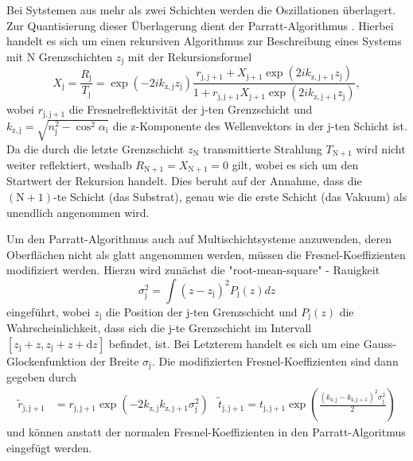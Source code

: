 Bei Sytstemen aus mehr als zwei Schichten werden die Oszillationen überlagert. Zur Quantisierung dieser Überlagerung dient der Parratt-Algorithmus \cite{parratt}. Hierbei handelt es sich um einen rekursiven Algorithmus zur Beschreibung eines Systems mit N Grenzschichten $z_\mathrm{j}$ mit der Rekursionsformel
\begin{equation*}
  X_\mathrm{j} = \frac{R_\mathrm{j}}{T_\mathrm{j}} = \exp \left( -2 i k_\mathrm{z,j} z_\mathrm{j} \right) \frac{ r_{\mathrm{j,j}+1} + X_{\mathrm{j}+1} \exp \left( 2i k_{\mathrm{z,j}+1} z_\mathrm{j} \right) }{ 1 + r_{\mathrm{j,j}+1} X_{\mathrm{j}+1} \exp \left( 2i k_{\mathrm{z,j}+1} z_\mathrm{j} \right) },
\end{equation*}
wobei $r_{\mathrm{j,j}+1}$ die Fresnelreflektivität der j-ten Grenzschicht und $k_{\mathrm{z,j}} = \sqrt{n_\mathrm{j}^2 - \cos^2 \alpha_\mathrm{i}} $ die z-Komponente des Wellenvektors in der j-ten Schicht ist.
Da die durch die letzte Grenzschicht $z_\mathrm{N}$ transmittierte Strahlung $T_{\mathrm{N}+1}$ wird nicht weiter reflektiert, weshalb $R_{\mathrm{N}+1} = X_{\mathrm{N}+1} = 0$ gilt, wobei es sich um den Startwert der Rekursion handelt. Dies beruht auf der Annahme, dass die $(\mathrm{N}+1)$-te Schicht (das Substrat), genau wie die erste Schicht (das Vakuum) als unendlich angenommen wird.

Um den Parratt-Algorithmus auch auf Multischichtsysteme anzuwenden, deren Oberflächen nicht als glatt angenommen werden, müssen die Fresnel-Koeffizienten modifiziert werden. Hierzu wird zunächst die "root-mean-square" - Rauigkeit
\begin{equation*}
  \sigma_\mathrm{j}^2 = \int \left( z - z_\mathrm{j} \right)^2 P_\mathrm{j} (z) dz
\end{equation*}
eingeführt, wobei $z_\mathrm{j}$ die Position der j-ten Grenzschicht und $P_\mathrm{j} (z)$ die Wahrscheinlichkeit, dass sich die j-te Grenzschicht im Intervall $[z_\mathrm{j} + z, z_\mathrm{j} + z + \mathrm{d}z]$ befindet, ist. Bei Letzterem handelt es sich um eine Gauss-Glockenfunktion der Breite $\sigma_\mathrm{j}$. Die modifizierten Fresnel-Koeffizienten sind dann gegeben durch
\begin{align*}
  \tilde{r}_{\mathrm{j,j}+1} &= r_{\mathrm{j,j}+1} \exp \left( -2 k_\mathrm{z,j} k_{\mathrm{z,j}+1} \sigma_\mathrm{j}^2 \right) &
  \tilde{t}_{\mathrm{j,j}+1} = t_{\mathrm{j,j}+1} \exp \left( \frac{ \left( k_\mathrm{z,j} - k_{\mathrm{z,j}+1} \right)^2 \sigma_\mathrm{j}^2 }{2} \right)
\end{align*}
und können anstatt der normalen Fresnel-Koeffizienten in den Parratt-Algoritmus eingefügt werden.

